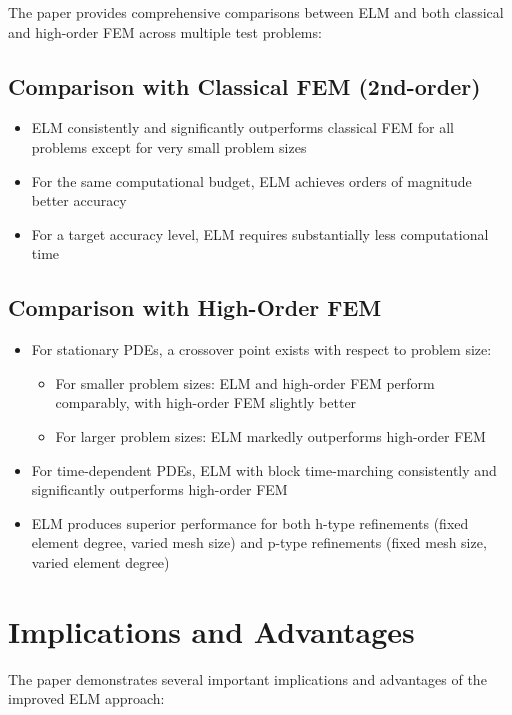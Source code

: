 \documentclass[11pt,a4paper]{article}
\begin{document}
The paper provides comprehensive comparisons between ELM and both classical and high-order FEM across multiple test problems:

\subsection{Comparison with Classical FEM (2nd-order)}

\begin{itemize}
    \item ELM consistently and significantly outperforms classical FEM for all problems except for very small problem sizes
    \item For the same computational budget, ELM achieves orders of magnitude better accuracy
    \item For a target accuracy level, ELM requires substantially less computational time
\end{itemize}

\subsection{Comparison with High-Order FEM}

\begin{itemize}
    \item For stationary PDEs, a crossover point exists with respect to problem size:
    \begin{itemize}
        \item For smaller problem sizes: ELM and high-order FEM perform comparably, with high-order FEM slightly better
        \item For larger problem sizes: ELM markedly outperforms high-order FEM
    \end{itemize}
    \item For time-dependent PDEs, ELM with block time-marching consistently and significantly outperforms high-order FEM
    \item ELM produces superior performance for both h-type refinements (fixed element degree, varied mesh size) and p-type refinements (fixed mesh size, varied element degree)
\end{itemize}

\section{Implications and Advantages}

The paper demonstrates several important implications and advantages of the improved ELM approach:
\end{document}

